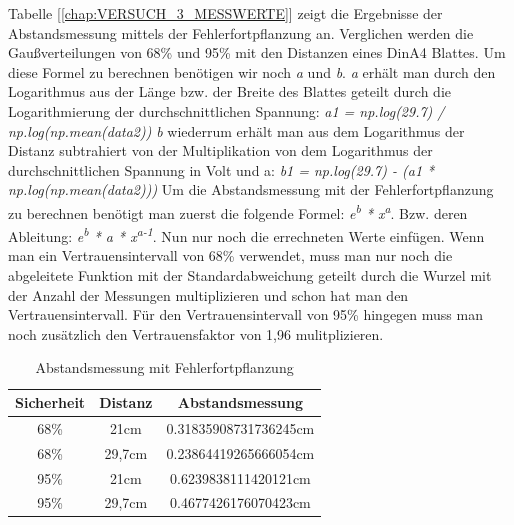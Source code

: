 \documentclass[12pt, oneside, a4paper, \docLanguage]{report}
\begin{document}
Tabelle [\ref{chap:VERSUCH_3_MESSWERTE}] zeigt die Ergebnisse der Abstandsmessung mittels der Fehlerfortpflanzung an.
Verglichen werden die Gaußverteilungen von 68\% und 95\% mit den Distanzen eines DinA4 Blattes.
Um diese Formel zu berechnen benötigen wir noch \textit{a} und \textit{b}. 
\newline \textit{a} erhält man durch den Logarithmus aus der Länge bzw. der Breite des Blattes geteilt durch die Logarithmierung der durchschnittlichen Spannung:
\newline 
\textit{a1 = np.log(29.7) / np.log(np.mean(data2))}
\newline
\newline
\textit{b} wiederrum erhält man aus dem Logarithmus der Distanz subtrahiert von der Multiplikation von dem Logarithmus der durchschnittlichen Spannung in Volt und a:
\newline
\textit{b1 = np.log(29.7) - (a1 * np.log(np.mean(data2)))}
\newline
Um die Abstandsmessung mit der Fehlerfortpflanzung zu berechnen benötigt man zuerst die folgende Formel:
\newline 
\textit{e\textsuperscript{b} *  x\textsuperscript{a}}.
\newline 
Bzw. deren Ableitung:
\textit{e\textsuperscript{b} * a * x\textsuperscript{a-1}}. Nun nur noch  die errechneten Werte einfügen.
\newline 
\newline 
Wenn man ein Vertrauensintervall von 68\% verwendet, muss man nur noch die abgeleitete Funktion mit der Standardabweichung geteilt durch die Wurzel mit der Anzahl der Messungen multiplizieren und schon hat man den Vertrauensintervall.
Für den Vertrauensintervall von 95\% hingegen muss man noch zusätzlich den Vertrauensfaktor von 1,96 mulitplizieren.
\newline 
\begin{table}[H]
	\centering\small
	\begin{tabular}{|c|c|c|}
		\hline
		Sicherheit & Distanz &  Abstandsmessung \\
		\hline
		68\% & 21cm & 0.31835908731736245cm \\
		\hline
		68\% & 29,7cm & 0.23864419265666054cm \\
		\hline
		95\% & 21cm & 0.6239838111420121cm \\
		\hline
		95\%  & 29,7cm & 0.4677426176070423cm \\
		\hline
	\end{tabular}
	\caption{Abstandsmessung mit Fehlerfortpflanzung}
	\label{fig:VERSUCH_3_FEHLERFORTPFLANZUNG_ABSTANDSMESSUNG_TABELLE}
\end{table}
\end{document}
